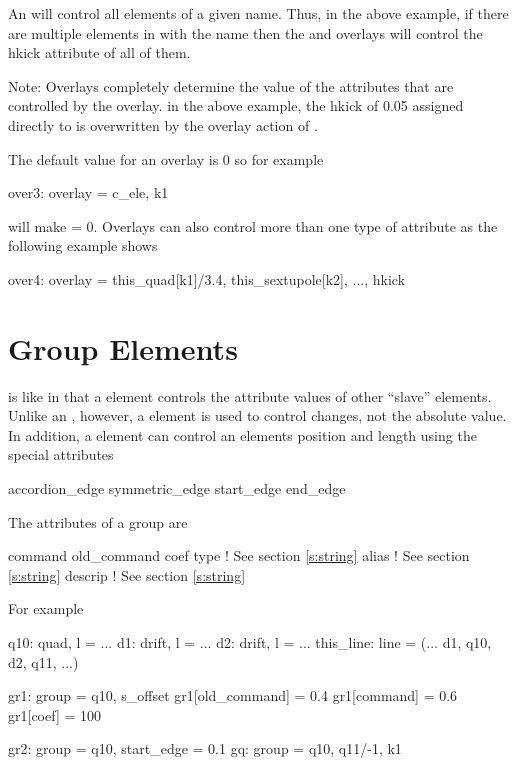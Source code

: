 An  will control all elements of a given name. 
Thus, in the above example, if there are multiple elements in  with 
the name  then the  and  overlays will control the hkick
attribute of all of them. 

Note: Overlays completely determine the value of the attributes that are controlled 
by the overlay. in the above example, the hkick of 0.05 assigned directly 
to  is overwritten by the overlay action of . 

\noindent The default value for an overlay is 0 so for example
\begin{example}
  over3: overlay = {c\_ele}, k1
\end{example}
will make  = 0. Overlays can also control more than one type of attribute
as the following example shows
\begin{example}
  over4: overlay = {this\_quad[k1]/3.4, this\_sextupole[k2], ...}, hkick
\end{example}


\section{Group Elements}
\label{s:group}
 
 is like  in that a  element controls the 
attribute values of other ``slave'' elements. Unlike an , however, 
a  element is used to control changes, not the absolute value. 
In addition, a  element can control an elements position and 
length using the special attributes
\begin{example}
  accordion\_edge
  symmetric\_edge  
  start_edge
  end\_edge
\end{example}
The attributes of a group are
\begin{example}
  command         
  old\_command     
  coef            
  type            ! See section \ref{s:string}
  alias           ! See section \ref{s:string}
  descrip         ! See section \ref{s:string}
\end{example}
For example
\begin{example}
  q10: quad, l = ...
  d1: drift, l = ...
  d2: drift, l = ...
  this\_line: line = (... d1, q10, d2, q11, ...)

  gr1: group = {q10}, s_offset
  gr1[old\_command] = 0.4
  gr1[command] = 0.6
  gr1[coef] = 100

  gr2: group = {q10}, start\_edge = 0.1
  gq: group = {q10, q11/-1}, k1
\end{example}

